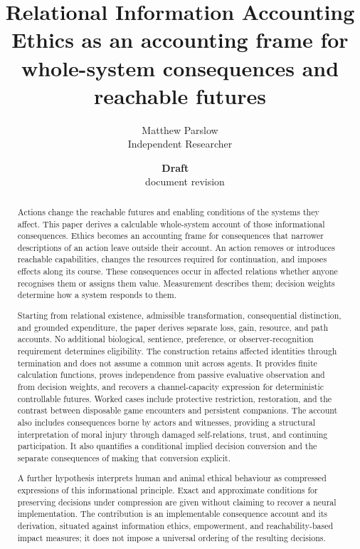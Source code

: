 \documentclass[11pt,a4paper]{article}
\title{Relational Information Accounting\\[5pt]
\large Ethics as an accounting frame for whole-system consequences and reachable futures}
\author{Matthew Parslow\\Independent Researcher}
\date{\textbf{Draft \texorpdfstring{\textemdash}{---}\ \PaperDraft}\\[2pt]\PaperDisplayDate\ \texorpdfstring{\textbullet}{\textperiodcentered}\ document revision \PaperRevision}
\theoremstyle{remark}
\begin{document}
\maketitle
\begin{center}
\end{center}

\begin{abstract}
Actions change the reachable futures and enabling conditions of the systems
they affect. This paper derives a calculable whole-system account of those
informational consequences. Ethics becomes an accounting frame for consequences
that narrower descriptions of an action leave outside their account. An action removes or introduces reachable
capabilities, changes the resources required for continuation, and imposes
effects along its course. These consequences occur in affected relations
whether anyone recognises them or assigns them value. Measurement describes
them; decision weights determine how a system responds to them.

Starting from relational existence, admissible transformation, consequential
distinction, and grounded expenditure, the paper derives separate loss, gain,
resource, and path accounts. No additional biological, sentience, preference,
or observer-recognition requirement determines eligibility. The construction
retains affected identities through termination and does not assume a common
unit across agents. It provides finite calculation functions, proves
independence from passive evaluative observation and from decision weights,
and recovers a channel-capacity expression for deterministic controllable
futures. Worked cases include protective restriction, restoration, and the
contrast between disposable game encounters and persistent companions. The
account also includes consequences borne by actors and witnesses, providing a
structural interpretation of moral injury through damaged self-relations, trust,
and continuing participation. It also quantifies a conditional implied decision
conversion and the separate consequences of making that conversion explicit.

A further hypothesis interprets human and animal ethical behaviour as compressed
expressions of this informational principle. Exact and approximate conditions
for preserving decisions under compression are given without claiming to recover
a neural implementation. The contribution is an implementable consequence
account and its derivation, situated against information ethics, empowerment,
and reachability-based impact measures; it does not impose a universal ordering
of the resulting decisions.
\end{abstract}
\end{document}
